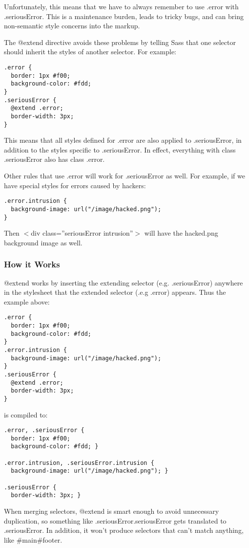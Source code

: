 \documentclass[10pt]{article}
\begin{document}
 Unfortunately, this means that we have to always remember to use .error with .seriousError. This is a maintenance burden, leads to tricky bugs, and can bring non-semantic style concerns into the markup.


 The @extend directive avoids these problems by telling Sass that one selector should inherit the styles of another selector. For example:
\begin{verbatim}
.error {
  border: 1px #f00;
  background-color: #fdd;
}
.seriousError {
  @extend .error;
  border-width: 3px;
}
\end{verbatim}


 This means that all styles defined for .error are also applied to .seriousError, in addition to the styles specific to .seriousError. In effect, everything with class .seriousError also has class .error.


 Other rules that use .error will work for .seriousError as well. For example, if we have special styles for errors caused by hackers:
\begin{verbatim}
.error.intrusion {
  background-image: url("/image/hacked.png");
}
\end{verbatim}


 Then $<$div class=''seriousError intrusion''$>$ will have the hacked.png background image as well.
\subsubsection{How it Works}


 @extend works by inserting the extending selector (e.g. .seriousError) anywhere in the stylesheet that the extended selector (.e.g .error) appears. Thus the example above:
\begin{verbatim}
.error {
  border: 1px #f00;
  background-color: #fdd;
}
.error.intrusion {
  background-image: url("/image/hacked.png");
}
.seriousError {
  @extend .error;
  border-width: 3px;
}
\end{verbatim}


 is compiled to:
\begin{verbatim}
.error, .seriousError {
  border: 1px #f00;
  background-color: #fdd; }

.error.intrusion, .seriousError.intrusion {
  background-image: url("/image/hacked.png"); }

.seriousError {
  border-width: 3px; }
\end{verbatim}


 When merging selectors, @extend is smart enough to avoid unnecessary duplication, so something like .seriousError.seriousError gets translated to .seriousError. In addition, it won’t produce selectors that can’t match anything, like \#main\#footer.
\end{document}
